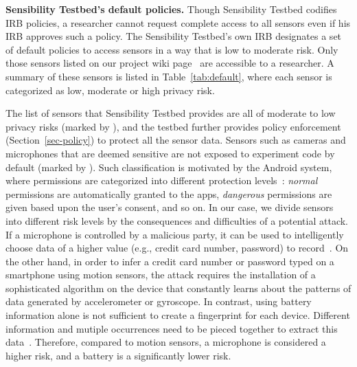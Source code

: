 \textbf{Sensibility Testbed's default policies.} %
Though Sensibility Testbed codifies IRB policies, 
a researcher cannot request complete access to all sensors 
even if his IRB approves such a policy. The Sensibility Testbed's
own IRB designates a set of default policies to access sensors in a
way that is low to moderate risk. 
Only those sensors listed on our project 
wiki page~\cite{sensor-api} are accessible to a researcher. 
A summary of these sensors is listed in Table~\ref{tab:default}, 
where each sensor is categorized as low, moderate or high 
privacy risk.

The list of sensors that Sensibility Testbed provides are all of moderate 
to low privacy risks (marked by \tickmark), and the testbed further provides policy enforcement
(Section~\ref{sec-policy}) to protect all the sensor data. Sensors 
such as cameras and microphones that are deemed sensitive are not 
exposed to experiment code by default (marked by \xmark). Such 
classification is motivated by the Android system, where 
permissions are categorized into different protection levels~\cite{level}:
\textit{normal} permissions are automatically granted to the apps, 
\textit{dangerous} permissions are given based upon the 
user's consent, and so on. In our case, 
we divide sensors into different risk levels by the consequences and 
difficulties of a potential attack. If a microphone is controlled by 
a malicious party, it can be used to intelligently choose data of a 
higher value (e.g., credit card number, password) to record~\cite{zhang2015leave}. On the other 
hand, in order to infer a credit card number or password typed on a 
smartphone using motion sensors, the attack requires the installation of 
a sophisticated algorithm on the device that constantly learns about  
the patterns of data generated by accelerometer or gyroscope. In contrast,
using battery information alone is not sufficient to create a fingerprint 
for each device. Different information and mutiple occurrences need to
be pieced together to extract this data~\cite{battery-priv}. Therefore, 
compared to motion sensors, a microphone is considered a higher risk, 
and a battery is a significantly lower risk.


